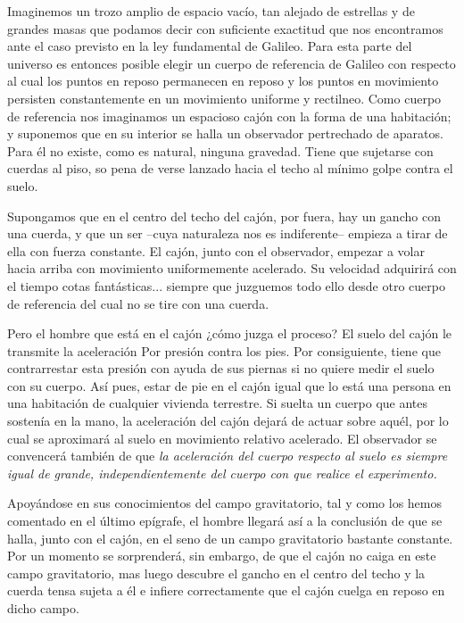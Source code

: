 \documentclass[spanish]{book}
\begin{document}
Imaginemos un trozo amplio de espacio vacío, tan alejado de estrellas y de grandes
masas que podamos decir con suficiente exactitud que nos encontramos ante el caso
previsto en la ley fundamental de Galileo. Para esta parte del universo es entonces
posible elegir un cuerpo de referencia de Galileo con respecto al cual los puntos en
reposo permanecen en reposo y los puntos en movimiento persisten constantemente en
un movimiento uniforme y rectilneo. Como cuerpo de referencia nos imaginamos un
espacioso cajón con la forma de una habitación; y suponemos que en su interior se
halla un observador pertrechado de aparatos. Para él no existe, como es natural,
ninguna gravedad. Tiene que sujetarse con cuerdas al piso, so pena de verse lanzado
hacia el techo al mínimo golpe contra el suelo.

Supongamos que en el centro del techo del cajón, por fuera, hay un gancho con
una cuerda, y que un ser --cuya naturaleza nos es indiferente-- empieza a tirar de ella
con fuerza constante. El cajón, junto con el observador, empezar a volar hacia arriba
con movimiento uniformemente acelerado. Su velocidad adquirirá con el tiempo cotas
fantásticas... siempre que juzguemos todo ello desde otro cuerpo de referencia del
cual no se tire con una cuerda.

Pero el hombre que está en el cajón ¿cómo juzga el proceso? El suelo del cajón le
transmite la aceleración Por presión contra los pies. Por consiguiente, tiene que
contrarrestar esta presión con ayuda de sus piernas si no quiere medir el suelo con su
cuerpo. Así pues, estar de pie en el cajón igual que lo está una persona en una
habitación de cualquier vivienda terrestre. Si suelta un cuerpo que antes sostenía en la
mano, la aceleración del cajón dejará de actuar sobre aquél, por lo cual se aproximará
al suelo en movimiento relativo acelerado. El observador se convencerá también de que
\textit{la aceleración del cuerpo respecto al suelo es siempre igual de grande, independientemente del
cuerpo con que realice el experimento.}

Apoyándose en sus conocimientos del campo gravitatorio, tal y como los hemos
comentado en el último epígrafe, el hombre llegará así a la conclusión de que se halla,
junto con el cajón, en el seno de un campo gravitatorio bastante constante. Por un
momento se sorprenderá, sin embargo, de que el cajón no caiga en este campo
gravitatorio, mas luego descubre el gancho en el centro del techo y la cuerda tensa
sujeta a él e infiere correctamente que el cajón cuelga en reposo en dicho campo.
\end{document}
